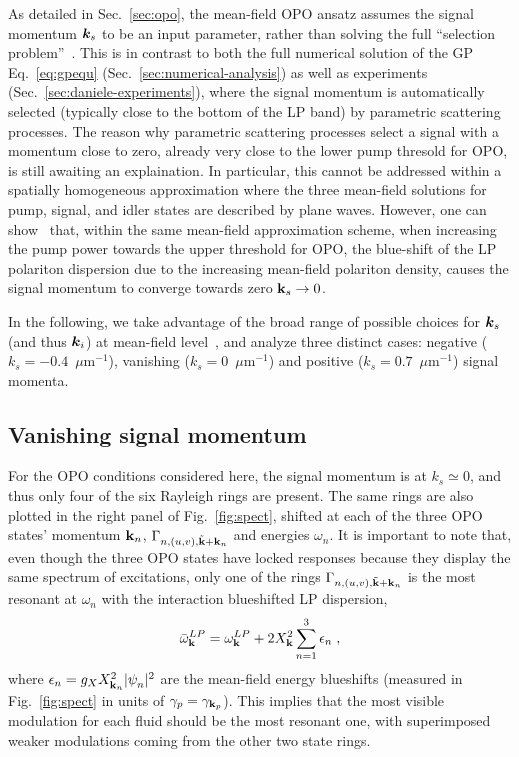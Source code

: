 As detailed in Sec.~\ref{sec:opo}, the mean-field OPO ansatz assumes
the signal momentum $\bm{k}_s$ to be an input parameter, rather than
solving the full ``selection problem''~\cite{Wouters_2007_b}. This is
in contrast to both the full numerical solution of the GP
Eq.~\eqref{eq:gpequ} (Sec.~\ref{sec:numerical-analysis}) as well as
experiments (Sec.~\ref{sec:daniele-experiments}), where the signal
momentum is automatically selected (typically close to the bottom of
the LP band) by parametric scattering processes. The reason why
parametric scattering processes select a signal with a momentum close
to zero, already very close to the lower pump thresold for OPO, is
still awaiting an explaination. In particular, this cannot be
addressed within a spatially homogeneous approximation where the three
mean-field solutions for pump, signal, and idler states are described
by plane waves. However, one can show~\cite{Whittaker_2005} that,
within the same mean-field approximation scheme, when increasing the
pump power towards the upper threshold for OPO, the blue-shift of the
LP polariton dispersion due to the increasing mean-field polariton
density, causes the signal momentum to converge towards zero
$\mathbf{k}_s \rightarrow 0$.  

In the following, we take advantage of the broad range of possible
choices for $\bm{k}_s$ (and thus $\bm{k}_i$) at mean-field
level~\cite{Wouters_2007_b}, and analyze three distinct cases:
negative ($k_s = -0.4$~$\mu$m$^{-1}$), vanishing
($k_s = 0$~$\mu$m$^{-1}$) and positive ($k_s = 0.7$~$\mu$m$^{-1}$)
signal momenta.


\subsection{Vanishing signal momentum}
\label{subsec:vanishing-signal}
%
For the OPO conditions considered here, the signal momentum is at
$k_s \simeq 0$, and thus only four of the six Rayleigh rings are
present. The same rings are also plotted in the right panel of
Fig.~\ref{fig:spect}, shifted at each of the three OPO states'
momentum $\mathbf{k}_n$, $\Gamma_{n,(u,v), \tilde{\mathbf{k}}+\mathbf{k}_n}$ and
energies $\omega_n$.
%
It is important to note that, even though the three OPO states have
locked responses because they display the same spectrum of
excitations, only one of the rings $\Gamma_{n,(u,v),
  \tilde{\mathbf{k}}+\mathbf{k}_n}$ is the most resonant at $\omega_n$
with the interaction blueshifted LP dispersion,
%
\begin{equation}
  \bar{\omega}_{\mathbf{k}}^{LP} = \omega_{\mathbf{k}}^{LP} + 2 
  X_{\mathbf{k}}^2 \sum_{n=1}^3  \epsilon_n\; ,
\label{eq:blues}
\end{equation}
%
where $\epsilon_n = g_X X_{\mathbf{k}_n}^2 |\psi_n^{}|^2$ are the
mean-field energy blueshifts (measured in Fig.~\ref{fig:spect} in
units of $\gamma_p = \gamma_{\mathbf{k}_p}$).  This implies that the
most visible modulation for each fluid should be the most resonant
one, with superimposed weaker modulations coming from the other two
state rings.


